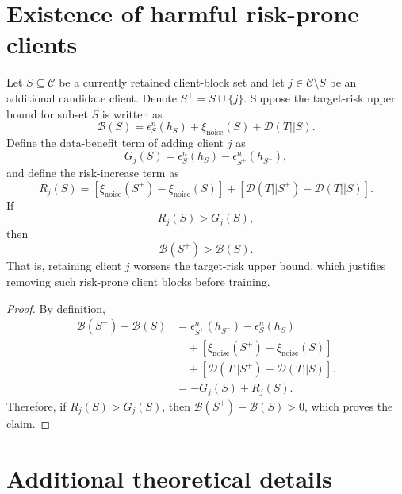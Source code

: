 ﻿\appendices

\section{Existence of harmful risk-prone clients}
\label{app:harmful_risk_prone_client}
Let $S\subseteq\mathcal{C}$ be a currently retained client-block set and let 
$j\in\mathcal{C}\setminus S$ be an additional candidate client. 
Denote $S^+=S\cup\{j\}$. 
Suppose the target-risk upper bound for subset $S$ is written as
\[
\mathcal{B}(S)
=
\epsilon_S^n(h_S)
+
\xi_{\mathrm{noise}}(S)
+
\mathcal{D}(T||S).
\]
Define the data-benefit term of adding client $j$ as
\[
G_j(S)
=
\epsilon_S^n(h_S)
-
\epsilon_{S^+}^n(h_{S^+}),
\]
and define the risk-increase term as
\[
R_j(S)
=
\left[
\xi_{\mathrm{noise}}(S^+)-\xi_{\mathrm{noise}}(S)
\right]
+
\left[\mathcal{D}(T||S^+)
-
\mathcal{D}(T||S)\right].
\]
If
\[
R_j(S)>G_j(S),
\]
then
\[
\mathcal{B}(S^+)>\mathcal{B}(S).
\]
That is, retaining client $j$ worsens the target-risk upper bound, which justifies removing such risk-prone client blocks before training.


\begin{proof}
By definition,
\[
\begin{aligned}
\mathcal{B}(S^+)-\mathcal{B}(S)
&=
\epsilon_{S^+}^n(h_{S^+})
-
\epsilon_S^n(h_S)
\\
&\quad+
\left[
\xi_{\mathrm{noise}}(S^+)-\xi_{\mathrm{noise}}(S)
\right]
\\
&\quad+
\left[\mathcal{D}(T||S^+)
-
\mathcal{D}(T||S)\right].
\\
&=
-G_j(S)+R_j(S).
\end{aligned}
\]
Therefore, if $R_j(S)>G_j(S)$, then 
$\mathcal{B}(S^+)-\mathcal{B}(S)>0$, which proves the claim.
\end{proof}

\section{Additional theoretical details}
\label{app:theory_appendix}
